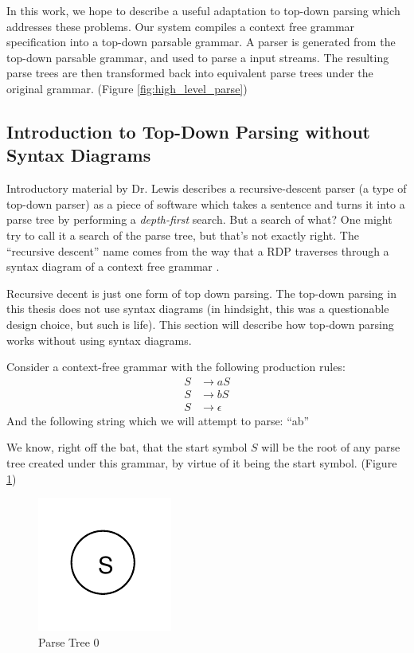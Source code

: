 \documentclass[11pt]{article}
\begin{document}
{In this work, we hope to describe a useful adaptation to top-down parsing
which addresses these problems. Our system compiles a context free grammar 
specification into a top-down parsable grammar.
A parser is generated from the top-down parsable grammar,
and used to parse a input streams. 
The resulting parse trees are then transformed back into equivalent
parse trees under the original grammar. (Figure \ref{fig:high_level_parse})

\subsection{Introduction to Top-Down Parsing without Syntax Diagrams}
\label{rd_wo_sd}
Introductory material by Dr. Lewis \cite{lewis} describes a recursive-descent parser (a type of top-down parser)
as a piece of software which takes a sentence and turns it into a parse tree by performing a {\em depth-first} search. 
But a search of what? One might try to call it a search of the parse tree, but that's not exactly right.
The ``recursive descent'' name comes from the way that a RDP traverses through a
syntax diagram of a context free grammar \cite{compiler}.

Recursive decent is just one form of top down parsing. The top-down parsing in this thesis
does not use syntax diagrams (in hindsight, this was a questionable design choice, 
but such is life). This section will describe how top-down parsing works without
using syntax diagrams.

Consider a context-free grammar with the following production rules:
\setcounter{equation}{0}
\begin{align}
S &\rightarrow a S\\
S &\rightarrow b S\\
S &\rightarrow \epsilon
\end{align}
And the following string which we will attempt to parse: ``ab''

We know, right off the bat, that the start symbol $S$ will be the root of any parse tree created under this
grammar, by virtue of it being the start symbol. (Figure \ref{fig:rdp_0})

\begin{figure}[h!]
    \centering
    \includegraphics[natwidth=15,natheight=15]{umlet/rdp_0.pdf}
    \caption{Parse Tree 0}
    \label{fig:rdp_0}
\end{figure}

}
\end{document}
